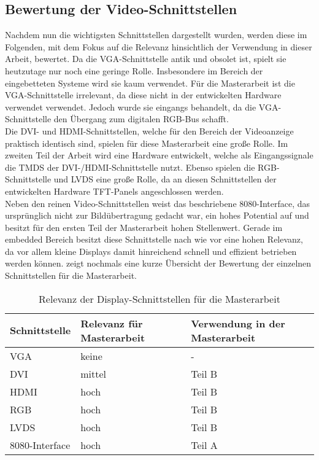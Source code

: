 \subsection{Bewertung der Video-Schnittstellen}
\label{cha:bewertung_video}
Nachdem nun die wichtigsten Schnittstellen dargestellt wurden, werden diese im Folgenden, mit dem Fokus auf die Relevanz hinsichtlich der Verwendung in dieser Arbeit, bewertet.
Da die VGA-Schnittstelle antik und obsolet ist, spielt sie heutzutage nur noch eine geringe Rolle. Insbesondere im Bereich der eingebetteten Systeme wird sie kaum verwendet. Für die Masterarbeit ist die VGA-Schnittstelle irrelevant, da diese nicht in der entwickelten Hardware verwendet verwendet. Jedoch wurde sie eingangs behandelt, da die VGA-Schnittstelle den Übergang zum digitalen RGB-Bus schafft.\\
Die DVI- und HDMI-Schnittstellen, welche für den Bereich der Videoanzeige praktisch identisch sind, spielen für diese Masterarbeit eine große Rolle. Im zweiten Teil der Arbeit wird eine Hardware entwickelt, welche als Eingangssignale die TMDS der DVI-/HDMI-Schnittstelle nutzt. 
Ebenso spielen die RGB-Schnittstelle und LVDS eine große Rolle, da an diesen Schnittstellen der entwickelten Hardware TFT-Panels angeschlossen werden. \\
Neben den reinen Video-Schnittstellen weist das beschriebene 8080-Interface, das ursprünglich nicht zur Bildübertragung gedacht war, ein hohes Potential auf und besitzt für den ersten Teil der Masterarbeit hohen Stellenwert. Gerade im embedded Bereich besitzt diese Schnittstelle nach wie vor eine hohen Relevanz, da vor allem kleine Displays damit hinreichend schnell und effizient betrieben werden können.  zeigt nochmals eine kurze Übersicht der Bewertung der einzelnen Schnittstellen für die Masterarbeit.

\begin{table}[h]
\begin{tabular}{|p{3cm}|p{5cm}|p{4.5cm}|}\hline
\rowcolor{TableBackgroundColor}
   \textbf{Schnittstelle} 	& \textbf{Relevanz für Masterarbeit} 	& \textbf{Verwendung in der Masterarbeit}	\\ \hline
   VGA 						& keine  								& - 	 									\\ \hline
   DVI 						& mittel 								& Teil B 									\\ \hline
   HDMI						& hoch 									& Teil B 									\\ \hline
   RGB 						& hoch 									& Teil B 									\\ \hline
   LVDS 					& hoch									& Teil B 									\\ \hline
   8080-Interface 			& hoch 									& Teil A 									\\ \hline
\end{tabular}
\caption{Relevanz der Display-Schnittstellen für die Masterarbeit}
\label{tab:interface_vergleich}
\end{table}

